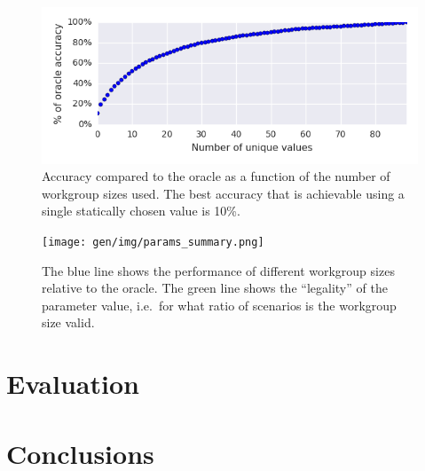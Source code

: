 \begin{figure}
\centering
\includegraphics{gen/img/num_param_oracle.png}
\caption{%
  Accuracy compared to the oracle as a function of the number of
  workgroup sizes used. The best accuracy that is achievable using a
  single statically chosen value is 10\%.%
}
\end{figure}

\begin{figure}
\centering
\texttt{[image: gen/img/params\_summary.png]}
\caption{%
  The blue line shows the performance of different workgroup sizes
  relative to the oracle. The green line shows the ``legality'' of the
  parameter value, i.e.\ for what ratio of scenarios is the workgroup
  size valid.%
}
\end{figure}

\section{Evaluation}


\section{Conclusions}


\clearpage
\begin{appendices}
\end{appendices}


